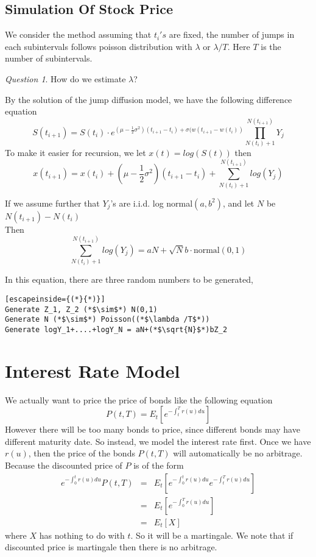 \documentclass[12pt]{amsart}
\theoremstyle{definition}
\theoremstyle{remark}
\newtheorem{question}[theorem]{Question}
\begin{document}
\subsection{Simulation Of Stock Price}

We consider the method assuming that $t_i's $ are fixed, the number of jumps in each subintervals follows poisson distribution with 
$\lambda$ or $\lambda /T$. Here $T$ is the number of subintervals.
\begin{question}
How do we estimate $\lambda$?
\end{question}


By the solution of the jump diffusion model, we have the following difference equation
\begin{equation*}
S(t_{i+1}) = S(t_i)\cdot e^{(\mu - \frac{1}{2}\sigma ^2)(t_{i+1}-t_i) +\sigma (w(t_{i+1}-w(t_i))  }\prod _{N(t_i)+1}^{N(t_{i+1})}Y_j
\end{equation*}
To make it easier for recursion, we let $x(t)= log (S(t))$ then
\begin{equation*}
x(t_{i+1}) = x(t_{i}) + (\mu - \frac{1}{2}\sigma ^2)(t_{i+1}-t_i) + \sum _{N(t_i)+1}^{N(t_{i+1})} log(Y_j)
\end{equation*}

If we assume further that $Y_j$'s are i.i.d. log normal$(a, b^2)$,  and let $N$ be $N(t_{i+1})-N(t_i)$\\
Then 
\begin{equation*}
\sum _{N(t_i)+1}^{N(t_{i+1})} log(Y_j) = aN + \sqrt{N}b\cdot \mbox{normal}(0,1)
\end{equation*}


In this equation, there are three random numbers to be generated, 
\begin{lstlisting}[escapeinside={(*}{*)}]
Generate Z_1, Z_2 (*$\sim$*) N(0,1)
Generate N (*$\sim$*) Poisson((*$\lambda /T$*))
Generate logY_1+....+logY_N = aN+(*$\sqrt{N}$*)bZ_2 
\end{lstlisting}

\newpage

\section{Interest Rate Model }
We actually want to price the price of bonds like the following equation
\begin{equation*}
P(t, T) = E_t[e^{-\int ^T_tr(u)du}]
\end{equation*}
However there will be too many bonds to price, since different bonds may have different maturity date.
So instead, we model the interest rate first. 
Once we have $r(u)$, then the price of the bonds $P(t,T)$ will automatically be no arbitrage. 
Because the discounted price of $P$ is of the form
\begin{eqnarray*}
e^{-\int ^t_0r(u)du}P(t,T) &=& E_t[ e^{-\int ^t_0r(u)du} e^{-\int ^T_tr(u)du} ]\\
&=& E_t[e^{-\int ^T_0 r(u)du}]\\
&=& E_t[X]
\end{eqnarray*}
where $X$ has nothing to do with $t$. 
So it will be a martingale. We note that if discounted price is martingale then 
there is no arbitrage.
\end{document}
